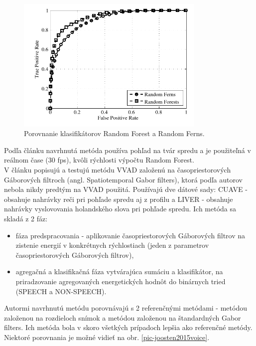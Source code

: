 \begin{figure}[H]
	\begin{center}
		\includegraphics[height=6.5cm]{pics/ferns&forests.png}
		\caption{Porovnanie klasifikátorov Random Forest a Random Ferns.
		 \cite{vieriu2014real}}
		\label{pic-ferns&forests}
	\end{center}
\end{figure}

Podľa článku navrhnutá metóda používa pohľad na tvár spredu a je použiteľná v reálnom čase (30 fps), kvôli rýchlosti výpočtu Random Forest.\\

V článku \cite{joosten2015voice} popisujú a testujú metódu VVAD založenú na časopriestorových Gáborových filtroch (angl. Spatiotemporal Gabor filters), ktorá podľa autorov nebola nikdy predtým na VVAD použitá.
Používajú dve dátové sady: CUAVE - obsahuje nahrávky reči pri pohľade spredu aj z profilu a LIVER - obsahuje nahrávky vyslovovania holandského slova  pri pohľade spredu.
Ich metóda sa skladá z 2 fáz: 
\begin{itemize}
	\item fáza predspracovania - aplikovanie časopriestorových Gáborových filtrov na zistenie energií v konkrétnych rýchlostiach (jeden z parametrov časopriestorových Gáborových filtrov),
	\item agregačná a klasifikačná fáza vytvárajúca sumáciu a klasifikátor, na priradzovanie agregovaných energetických hodnôt do binárnych tried (SPEECH a NON-SPEECH).
\end{itemize}
Autormi navrhnutú metódu porovnávajú s 2 referenčnými metódami - metódou založenou na rozdieloch snímok a metódou založenou na štandardných Gabor filters. 
Ich metóda bola v skoro všetkých prípadoch lepšia ako referenčné metódy. 
Niektoré porovnania je možné vidieť na obr. \ref{pic-joosten2015voice}.

